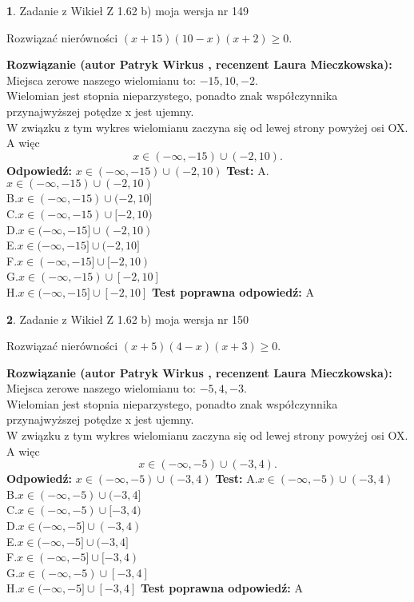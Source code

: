 \documentclass[12pt, a4paper]{article}
\theoremstyle{definition} %
\newtheorem{zad}{}
\newcommand{\zadStart}[1]{\begin{zad}#1\newline}
\newcommand{\zadStop}{\end{zad}}
\newcommand{\rozwStart}[2]{\noindent \textbf{Rozwiązanie (autor #1 , recenzent #2): }\newline}
\newcommand{\rozwStop}{\newline}
\newcommand{\odpStart}{\noindent \textbf{Odpowiedź:}\newline}
\newcommand{\odpStop}{\newline}
\newcommand{\testStart}{\noindent \textbf{Test:}\newline}
\newcommand{\testStop}{\newline}
\newcommand{\kluczStart}{\noindent \textbf{Test poprawna odpowiedź:}\newline}
\newcommand{\kluczStop}{\newline}
\begin{document}
\zadStart{Zadanie z Wikieł Z 1.62 b) moja wersja nr 149}

Rozwiązać nierówności $(x+15)(10-x)(x+2)\ge0$.
\zadStop
\rozwStart{Patryk Wirkus}{Laura Mieczkowska}
Miejsca zerowe naszego wielomianu to: $-15, 10, -2$.\\
Wielomian jest stopnia nieparzystego, ponadto znak współczynnika przy\linebreak najwyższej potędze x jest ujemny.\\ W związku z tym wykres wielomianu zaczyna się od lewej strony powyżej osi OX. A więc $$x \in (-\infty,-15) \cup (-2,10).$$
\rozwStop
\odpStart
$x \in (-\infty,-15) \cup (-2,10)$
\odpStop
\testStart
A.$x \in (-\infty,-15) \cup (-2,10)$\\
B.$x \in (-\infty,-15) \cup (-2,10]$\\
C.$x \in (-\infty,-15) \cup [-2,10)$\\
D.$x \in (-\infty,-15] \cup (-2,10)$\\
E.$x \in (-\infty,-15] \cup (-2,10]$\\
F.$x \in (-\infty,-15] \cup [-2,10)$\\
G.$x \in (-\infty,-15) \cup [-2,10]$\\
H.$x \in (-\infty,-15] \cup [-2,10]$
\testStop
\kluczStart
A
\kluczStop



\zadStart{Zadanie z Wikieł Z 1.62 b) moja wersja nr 150}

Rozwiązać nierówności $(x+5)(4-x)(x+3)\ge0$.
\zadStop
\rozwStart{Patryk Wirkus}{Laura Mieczkowska}
Miejsca zerowe naszego wielomianu to: $-5, 4, -3$.\\
Wielomian jest stopnia nieparzystego, ponadto znak współczynnika przy\linebreak najwyższej potędze x jest ujemny.\\ W związku z tym wykres wielomianu zaczyna się od lewej strony powyżej osi OX. A więc $$x \in (-\infty,-5) \cup (-3,4).$$
\rozwStop
\odpStart
$x \in (-\infty,-5) \cup (-3,4)$
\odpStop
\testStart
A.$x \in (-\infty,-5) \cup (-3,4)$\\
B.$x \in (-\infty,-5) \cup (-3,4]$\\
C.$x \in (-\infty,-5) \cup [-3,4)$\\
D.$x \in (-\infty,-5] \cup (-3,4)$\\
E.$x \in (-\infty,-5] \cup (-3,4]$\\
F.$x \in (-\infty,-5] \cup [-3,4)$\\
G.$x \in (-\infty,-5) \cup [-3,4]$\\
H.$x \in (-\infty,-5] \cup [-3,4]$
\testStop
\kluczStart
A
\kluczStop
\end{document}
